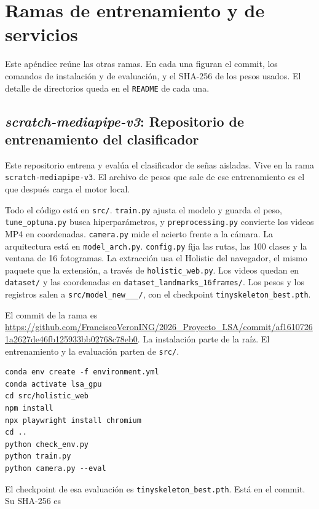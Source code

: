 \chapter{Ramas de entrenamiento y de servicios}
\label{ap:ramas}

Este apéndice reúne las otras ramas. En cada una figuran el commit, los comandos de instalación y de evaluación, y el SHA-256 de los pesos usados. El detalle de directorios queda en el \texttt{README} de cada una.

\section{\textit{scratch-mediapipe-v3}: Repositorio de entrenamiento del clasificador}
Este repositorio entrena y evalúa el clasificador de señas aisladas. Vive en la rama \texttt{scratch-mediapipe-v3}. El archivo de pesos que sale de ese entrenamiento es el que después carga el motor local.

Todo el código está en \texttt{src/}. \texttt{train.py} ajusta el modelo y guarda el peso, \texttt{tune\_\allowbreak optuna.py} busca hiperparámetros, y \texttt{preprocessing.py} convierte los videos MP4 en coordenadas. \texttt{camera.py} mide el acierto frente a la cámara. La arquitectura está en \texttt{model\_arch.py}. \texttt{config.py} fija las rutas, las 100 clases y la ventana de 16 fotogramas. La extracción usa el Holistic del navegador, el mismo paquete que la extensión, a través de \texttt{holistic\_web.py}. Los videos quedan en \texttt{dataset/} y las coordenadas en \texttt{dataset\_\allowbreak landmarks\_\allowbreak 16frames/}. Los pesos y los registros salen a \texttt{src/\allowbreak model\_\allowbreak new\_\_\_/}, con el checkpoint \texttt{tinyskeleton\_\allowbreak best.pth}.

El commit de la rama es \url{https://github.com/FranciscoVeronING/2026_Proyecto_LSA/commit/af16107261a2627de46fb125933bb02768c78eb0}. La instalación parte de la raíz. El entrenamiento y la evaluación parten de \texttt{src/}.

\begin{lstlisting}
conda env create -f environment.yml
conda activate lsa_gpu
cd src/holistic_web
npm install
npx playwright install chromium
cd ..
python check_env.py
python train.py
python camera.py --eval
\end{lstlisting}

El checkpoint de esa evaluación es \texttt{tinyskeleton\_best.pth}. Está en el commit. Su SHA-256 es

